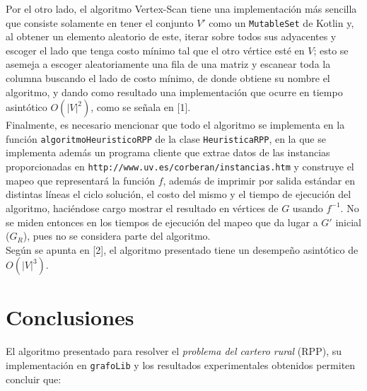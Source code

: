 \documentclass[11pt]{article}
\begin{document}
Por el otro lado, el algoritmo Vertex-Scan tiene una implementación más
sencilla que consiste solamente en tener el conjunto $V'$ como un \texttt{MutableSet}
de Kotlin y, al obtener un elemento aleatorio de este, iterar sobre todos sus adyacentes
y escoger el lado que tenga costo mínimo tal que el otro vértice esté en $V$; esto se 
asemeja a escoger aleatoriamente una fila de una matriz y escanear toda la columna
buscando el lado de costo mínimo, de donde obtiene su nombre el algoritmo, y dando 
como resultado una implementación que ocurre en tiempo asintótico $O(|V|^2)$, como
se señala en [1]. \\

Finalmente, es necesario mencionar que todo el algoritmo se implementa
en la función \texttt{algoritmoHeuristicoRPP} de la clase \texttt{HeuristicaRPP},
en la que se implementa además un programa cliente que extrae datos de las instancias
proporcionadas en \texttt{http://www.uv.es/corberan/instancias.htm} y construye
el mapeo que representará la función $f$, además de imprimir por salida estándar
en distintas líneas el ciclo solución, el costo del mismo y el tiempo de ejecución
del algoritmo, haciéndose cargo mostrar el resultado en vértices de $G$ usando $f^{-1}$.
No se miden entonces en los tiempos de ejecución del mapeo que da lugar a $G'$ inicial
($G_R$), pues no se considera parte del algoritmo. \\

Según se apunta en [2], el algoritmo presentado tiene un desempeño asintótico de
$O(|V|^3)$.

\section{Conclusiones}

El algoritmo presentado para resolver el \emph{problema del cartero rural} (RPP),
su implementación en \texttt{grafoLib} y los resultados 
experimentales obtenidos permiten concluir que:
\end{document}

